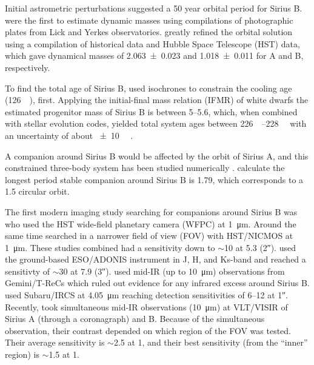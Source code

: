 \documentclass[twocolumn]{aastex631}
\begin{document}
Initial astrometric perturbations suggested a 50 year orbital period \citep{auwers_orbit_1864} for Sirius B. \citet{van_den_bos_orbit_1960,gatewood_study_1978} were the first to estimate dynamic masses using compilations of photographic plates from Lick and Yerkes observatories. \citet{bond_sirius_2017} greatly refined the orbital solution using a compilation of historical data and Hubble Space Telescope (HST) data, which gave dynamical masses of \qty{2.063+-0.023}{\solarmass} and \qty{1.018+-0.011}{\solarmass} for A and B, respectively.

To find the total age of Sirius B, \citet{bond_sirius_2017} used isochrones to constrain the cooling age (\qty{126}{\mega\year}), first. Applying the initial-final mass relation (IFMR) of white dwarfs \citep{cummings_two_2016} the estimated progenitor mass of Sirius B is between \qtyrange{5}{5.6}{\solarmass}, which, when combined with stellar evolution codes, yielded total system ages between \qtyrange{226}{228}{\mega\year} with an uncertainty of about \qty{+-10}{\mega\year} \citep{bond_sirius_2017}.

A companion around Sirius B would be affected by the orbit of Sirius A, and this constrained three-body system has been studied numerically \citep{holman_long-term_1999}. \citet{bond_sirius_2017} calculate the longest period stable companion around Sirius B is \qty{1.79}{\year}, which corresponds to a \qty{1.5}{\au} circular orbit.

The first modern imaging study searching for companions around Sirius B was \citet{schroeder_search_2000} who used the HST wide-field planetary camera (WFPC) at \qty{1}{\micro\meter}. Around the same time \citet{kuchner_search_2000} searched in a narrower field of view (FOV) with HST/NICMOS at \qty{1}{\micro\meter}. These studies combined had a sensitivity down to $\sim$\qty{10}{\jupitermass} at \qty{5.3}{\au} (\ang{;;2}). \citet{bonnet-bidaud_adonis_2008} used the ground-based ESO/ADONIS instrument in J, H, and Ks-band and reached a sensitivty of $\sim$\qty{30}{\jupitermass} at \qty{7.9}{\au} (\ang{;;3}). \citet{skemer_sirius_2011} used mid-IR (up to \qty{10}{\micro\meter}) observations from Gemini/T-ReCs which ruled out evidence for any infrared excess around Sirius B. \citet{thalmann_piercing_2011} used Subaru/IRCS at \qty{4.05}{\micro\meter} reaching detection sensitivities of \qtyrange{6}{12}{\jupitermass} at \ang{;;1}. Recently, \citet{pathak_high_2021} took simultaneous mid-IR observations (\qty{10}{\micro\meter}) at VLT/VISIR of Sirius A (through a coronagraph) and B. Because of the simultaneous observation, their contrast depended on which region of the FOV was tested. Their average sensitivity is $\sim$\qty{2.5}{\jupitermass} at \qty{1}{\au}, and their best sensitivity (from the ``inner'' region) is $\sim$\qty{1.5}{\jupitermass} at \qty{1}{\au}.
\end{document}
